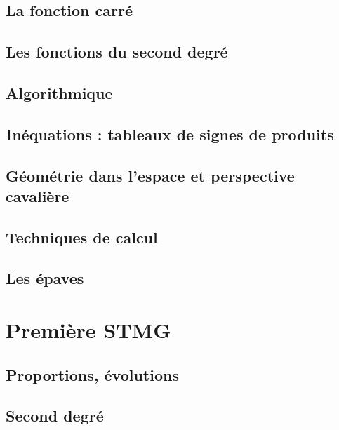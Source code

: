 \documentclass[a4paper,12pt]{book}
\begin{document}
\chapter{La fonction carré}


\chapter{Les fonctions du second degré}


\chapter{Algorithmique}


\chapter{Inéquations : tableaux de signes de produits}


\chapter{Géométrie dans l'espace et perspective cavalière}


\chapter{Techniques de calcul}


\chapter{Les épaves}


\part{Première STMG}
\chapter{Proportions, évolutions}


\chapter{Second degré}

\end{document}
